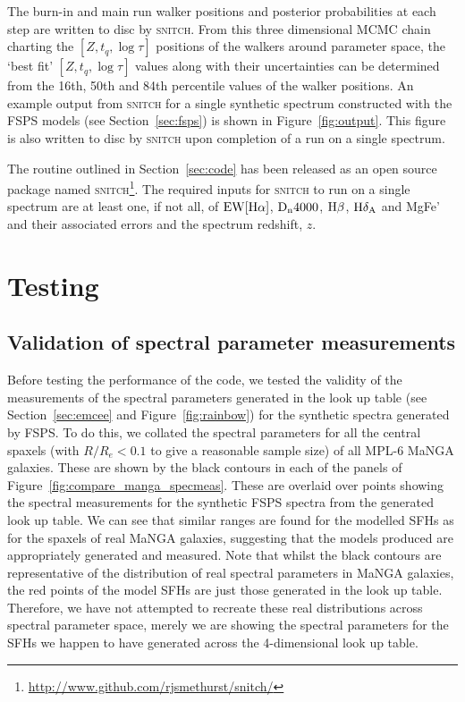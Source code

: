 \documentclass[useAMS,usenatbib]{mn2e}
\begin{document}
The burn-in and main run walker positions and posterior probabilities at each step are written to disc by \textsc{snitch}. From this three dimensional MCMC chain charting the $[Z, t_q, \log \tau]$ positions of the walkers around parameter space, the `best fit' $[Z, t_q, \log \tau]$ values along with their uncertainties can be determined from the 16th, 50th and 84th percentile values of the walker positions. An example output from \textsc{snitch} for a single synthetic spectrum constructed with the FSPS models (see Section~\ref{sec:fsps}) is shown in Figure~\ref{fig:output}. This figure is also written to disc by \textsc{snitch} upon completion of a run on a single spectrum.  


The routine outlined in Section~\ref{sec:code} has been released as an open source package named \textsc{snitch}\footnote{\url{http://www.github.com/rjsmethurst/snitch/}}. The required inputs for \textsc{snitch} to run on a single spectrum are at least one, if not all, of $\rm{EW}[H\alpha]$, $\rm{D}_n4000$, $\rm{H}\beta$, $\rm{H}\delta_A$ and MgFe' and their associated errors and the spectrum redshift, $z$. 

\section{Testing}\label{sec:test}

\subsection{Validation of spectral parameter measurements}\label{sec:precisiontest}


Before testing the performance of the code, we tested the validity of the measurements of the spectral parameters generated in the look up table (see Section~\ref{sec:emcee} and Figure~\ref{fig:rainbow}) for the synthetic spectra generated by FSPS. To do this, we collated the spectral parameters for all the central spaxels (with $R/R_e < 0.1$ to give a reasonable sample size) of all MPL-6 MaNGA galaxies. These are shown by the black contours in each of the panels of Figure~\ref{fig:compare_manga_specmeas}. These are overlaid over points showing the spectral measurements for the synthetic FSPS spectra from the generated look up table. We can see that similar ranges are found for the modelled SFHs as for the spaxels of real MaNGA galaxies, suggesting that the models produced are appropriately generated and measured. Note that whilst the black contours are representative of the distribution of real spectral parameters in MaNGA galaxies, the red points of the model SFHs are just those generated in the look up table. Therefore, we have not attempted to recreate these real distributions across spectral parameter space, merely we are showing the spectral parameters for the SFHs we happen to have generated across the 4-dimensional look up table. 
\end{document}
